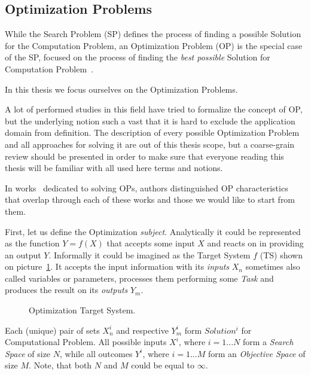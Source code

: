\subsection{Optimization Problems}\label{BG: subsection OPs}
While the Search Problem (SP) defines the process of finding a possible Solution for the Computation Problem, an Optimization Problem (OP) is the special case of the SP, focused on the process of finding the \emph{best possible} Solution for Computation Problem~\cite{goldreich2010p}.

In this thesis we focus ourselves on the Optimization Problems.

A lot of performed studies in this field have tried to formalize the concept of OP, but the underlying notion such a vast that it is hard to exclude the application domain from definition. The description of every possible Optimization Problem and all approaches for solving it are out of this thesis scope, but a coarse-grain review should be presented in order to make sure that everyone reading this thesis will be familiar with all used here terms and notions. 

In works~\cite{biegler2004retrospective,figueira2014hybrid,amaran2016simulation} dedicated to solving OPs, authors distinguished OP characteristics that overlap through each of these works and those we would like to start from them.


First, let us define the Optimization \textit{subject}. Analytically it could be represented as the function $Y = f(X)$ that accepts some input $X$ and reacts on in providing an output $Y$. Informally it could be imagined as the Target System $f$ (TS) shown on picture~\ref{bg:pic:Target System}. It accepts the input information with its \textit{inputs} $X_n$ sometimes also called variables or parameters, processes them performing some \textit{Task} and produces the result on its \textit{outputs} $Y_m$.

\begin{figure}
	\centering
	
	\caption{Optimization Target System.}
	\label{bg:pic:Target System}
\end{figure}

Each (unique) pair of sets $X_n^i$ and respective $Y_m^i$ form $Solution^i$ for Computational Problem.
All possible inputs $X^i$, where $i=1...N$ form a \textit{Search Space} of size $N$, while all outcomes $Y^i$, where $i=1...M$ form an \textit{Objective Space} of size $M$. Note, that both $N$ and $M$ could be equal to $\infty$.

